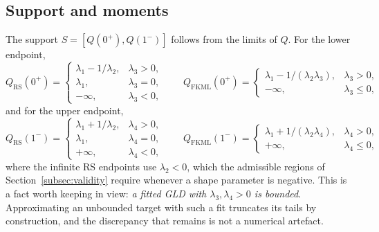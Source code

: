 \subsection{Support and moments}

The support $S = [Q(0^{+}), Q(1^{-})]$ follows from the limits of $Q$. For the
lower endpoint,
\begin{equation}
    Q_{\mathrm{RS}}(0^{+}) =
    \begin{cases}
        \lambda_1 - 1/\lambda_2, & \lambda_3 > 0, \\
        \lambda_1,               & \lambda_3 = 0, \\
        -\infty,                 & \lambda_3 < 0,
    \end{cases}
    \qquad
    Q_{\mathrm{FKML}}(0^{+}) =
    \begin{cases}
        \lambda_1 - 1/(\lambda_2\lambda_3), & \lambda_3 > 0, \\
        -\infty,                            & \lambda_3 \leq 0,
    \end{cases}
    \label{eq:support_lower}
\end{equation}
and for the upper endpoint,
\begin{equation}
    Q_{\mathrm{RS}}(1^{-}) =
    \begin{cases}
        \lambda_1 + 1/\lambda_2, & \lambda_4 > 0, \\
        \lambda_1,               & \lambda_4 = 0, \\
        +\infty,                 & \lambda_4 < 0,
    \end{cases}
    \qquad
    Q_{\mathrm{FKML}}(1^{-}) =
    \begin{cases}
        \lambda_1 + 1/(\lambda_2\lambda_4), & \lambda_4 > 0, \\
        +\infty,                            & \lambda_4 \leq 0,
    \end{cases}
    \label{eq:support_upper}
\end{equation}
where the infinite RS endpoints use $\lambda_2 < 0$, which the admissible
regions of Section~\ref{subsec:validity} require whenever a shape parameter is
negative. This is a fact worth keeping in view: \emph{a fitted GLD with
$\lambda_3, \lambda_4 > 0$ is bounded}. Approximating an unbounded target with
such a fit truncates its tails by construction, and the discrepancy that remains
is not a numerical artefact.

